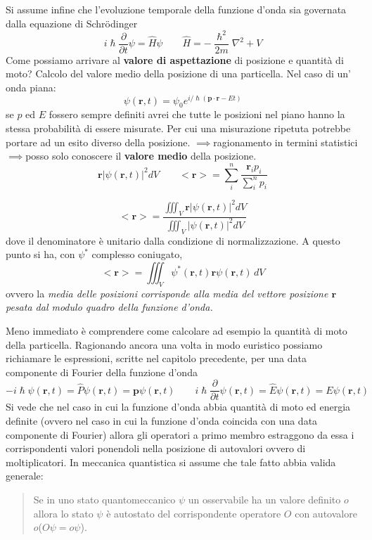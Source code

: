 Si assume infine che l'evoluzione temporale della funzione d'onda sia
governata dalla equazione di Schrödinger \[
	i \hslash \frac{\partial}{\partial t} \psi = \hat{H} \psi \qquad \hat{H} = - \frac{\hslash^{2}}{2m} \nabla^{2} + V
\] Come possiamo arrivare al \textbf{valore di aspettazione} di
posizione e quantità di moto?
Calcolo del valore medio della posizione
di una particella.
Nel caso di un' onda piana: \[
	\psi(\bm{r},t) = \psi_{0} e^{ i/\hslash (\bm{p} \cdot \bm{r}-Et) }
\] se \(p\) ed \(E\) fossero sempre definiti avrei che tutte le
posizioni nel piano hanno la stessa probabilità di essere misurate.
Per
cui una misurazione ripetuta potrebbe portare ad un esito diverso della
posizione. \(\implies\)ragionamento in termini
statistici\(\implies\)posso solo conoscere il \textbf{valore medio}
della posizione. \[
	\bm{r} |\psi(\bm{r},t)|^{2}dV \qquad <\bm{r}> = \sum_{i}^{n} \frac{\bm{r}_{i}p_{i}}{\sum_{i}^{n}p_{i}}
\]

\begin{equation}
	<\bm{r}> = \frac{\iiint_{V} \bm{r} |\psi(\bm{r},t)|^{2}dV }{\iiint_{V}|\psi(\bm{r},t)|^{2}dV }
\end{equation} dove il denominatore è unitario dalla condizione di
normalizzazione.
A questo punto si ha, con \(\psi^*\) complesso
coniugato, \[
	<\bm{r}> = \iiint_{V} \psi^*(\bm{r},t)\bm{r}\psi(\bm{r},t)\,dV
\] ovvero la \emph{media delle posizioni corrisponde alla media del
	vettore posizione \(\bm{r}\) pesata dal modulo quadro della funzione
	d'onda.}

Meno immediato è comprendere come calcolare ad esempio la quantità di
moto della particella.
Ragionando ancora una volta in modo euristico
possiamo richiamare le espressioni, scritte nel capitolo precedente, per
una data componente di Fourier della funzione d'onda \[
	- i \hslash \psi(\bm{r},t) = \hat{P} \psi(\bm{r},t) = \bm{p} \psi(\bm{r},t) \qquad
	i \hslash \frac{\partial}{\partial t} \psi(\bm{r},t) = \hat{E}\psi(\bm{r},t)= E\psi(\bm{r},t)
\] Si vede che nel caso in cui la funzione d'onda abbia quantità di moto
ed energia definite (ovvero nel caso in cui la funzione d'onda coincida
con una data componente di Fourier) allora gli operatori a primo membro
estraggono da essa i corrispondenti valori ponendoli nella posizione di
autovalori ovvero di moltiplicatori.
In meccanica quantistica si assume
che tale fatto abbia valida generale:

\begin{quote}
	Se in uno stato quantomeccanico \(\psi\) un osservabile ha un valore
	definito \(o\) allora lo stato \(\psi\) è autostato del corrispondente
	operatore \(O\) con autovalore \(o\)(\(O \psi = o \psi\)).
\end{quote}

